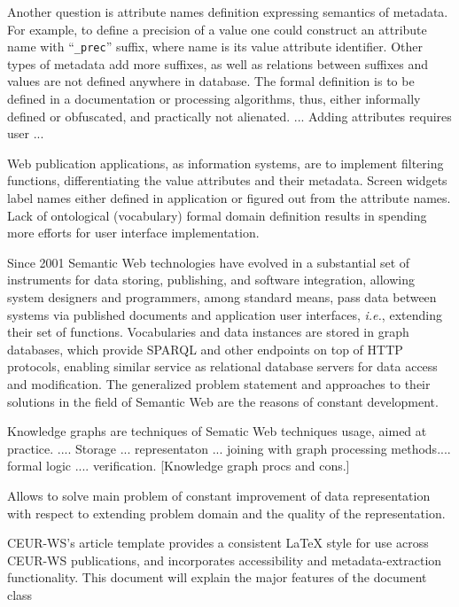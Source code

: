 \documentclass[
]{ceurart}
\begin{document}
Another question is attribute names definition expressing semantics of metadata.  For example, to define a precision of a value one could construct an attribute name with ``\texttt{\_prec}'' suffix, where name is its value attribute identifier.  Other types of metadata add more suffixes, as well as relations between suffixes and values are not defined anywhere in database.  The formal definition is to be defined in a documentation or processing algorithms, thus, either informally defined or obfuscated, and practically not alienated.  ... Adding attributes requires user ...

Web publication applications, as information systems, are to implement filtering functions, differentiating the value attributes and their metadata.  Screen widgets label names either defined in application or figured out from the attribute names.  Lack of ontological (vocabulary) formal domain definition results in spending more efforts for user interface implementation.

Since 2001 Semantic Web technologies have evolved in a substantial set of instruments for data storing, publishing, and software integration, allowing system designers and programmers, among standard means, pass data between systems via published documents and application user interfaces, \emph{i.e.}, extending their set of functions.  Vocabularies and data instances are stored in graph databases, which provide SPARQL and other endpoints on top of HTTP protocols, enabling similar service as relational database servers for data access and modification.  The generalized problem statement and approaches to their solutions in the field of Semantic Web are the reasons of constant development.

Knowledge graphs are techniques of Sematic Web techniques usage, aimed at practice.  .... Storage ... representaton ... joining with graph processing methods.... formal logic ....  verification.
[Knowledge graph procs and cons.]


Allows to solve main problem of constant improvement of data representation with respect to extending problem domain and the quality of the representation.



CEUR-WS's article template provides a consistent \LaTeX{} style for
use across CEUR-WS publications, and incorporates accessibility and
metadata-extraction functionality. This document will explain the
major features of the document class %
\end{document}
